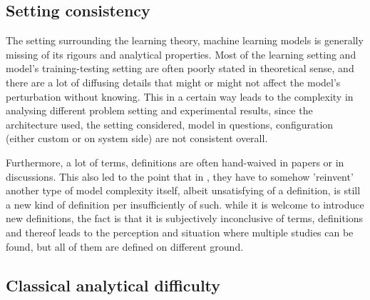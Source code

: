\documentclass{article}
\begin{document}
\subsection{Setting consistency}

The setting surrounding the learning theory, machine learning models is generally missing of its rigours and analytical properties. Most of the learning setting and model's training-testing setting are often poorly stated in theoretical sense, and there are a lot of diffusing details that might or might not affect the model's perturbation without knowing. This in a certain way leads to the complexity in analysing different problem setting and experimental results, since the architecture used, the setting considered, model in questions, configuration (either custom or on system side) are not consistent overall. 

Furthermore, a lot of terms, definitions are often hand-waived in papers or in discussions. This also led to the point that in \cite{nakkiran_deep_2019}, they have to somehow 'reinvent' another type of model complexity itself, albeit unsatisfying of a definition, is still a new kind of definition per insufficiently of such. while it is welcome to introduce new definitions, the fact is that it is subjectively inconclusive of terms, definitions and thereof leads to the perception and situation where multiple studies can be found, but all of them are defined on different ground.

\subsection{Classical analytical difficulty}
\end{document}
